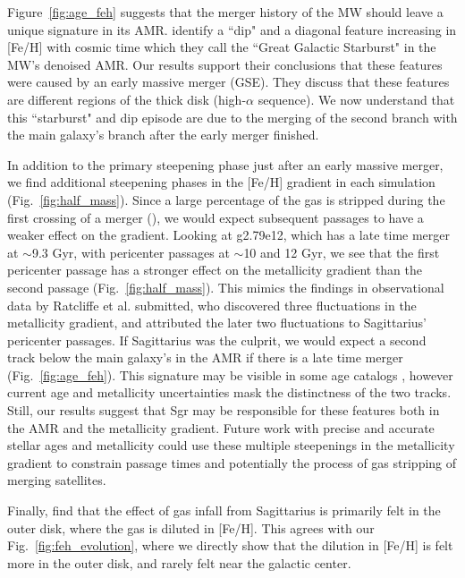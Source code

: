 \documentclass[useAMS,usenatbib]{mnras}
\begin{document}
Figure~\ref{fig:age_feh} suggests that the merger history of the MW should leave a unique signature in its AMR. \cite{Ciuca2022} identify a ``dip" and a diagonal feature increasing in [Fe/H] with cosmic time which they call the ``Great Galactic Starburst" in the MW's denoised AMR. Our results support their conclusions that these features were caused by an early massive merger (GSE). They discuss that these features are different regions of the thick disk (high-$\alpha$ sequence). We now understand that this ``starburst" and dip episode are due to the merging of the second branch with the main galaxy's branch after the early merger finished.

In addition to the primary steepening phase just after an early massive merger, we find additional steepening phases in the [Fe/H] gradient in each simulation (Fig.~\ref{fig:half_mass}).  Since a large percentage of the gas is stripped during the first crossing of a merger (\citealt{TepperGarcia2018}), we would expect subsequent passages to have a weaker effect on the gradient. Looking at g2.79e12, which has a late time merger at $\sim$9.3 Gyr, with pericenter passages at $\sim$10 and 12 Gyr, we see that the first pericenter passage has a stronger effect on the metallicity gradient than the second passage (Fig.~\ref{fig:half_mass}). This mimics the findings in observational data by Ratcliffe et al. submitted, who discovered three fluctuations in the metallicity gradient, and attributed the later two fluctuations to Sagittarius’ pericenter passages. If Sagittarius was the culprit, we would expect a second track below the main galaxy's in the AMR if there is a late time merger (Fig.~\ref{fig:age_feh}). This signature may be visible in some age catalogs \citep{Xiang2022,Anders2023}, however current age and metallicity uncertainties mask the distinctness of the two tracks. Still, our results suggest that Sgr may be responsible for these features both in the AMR and the metallicity gradient. Future work with precise and accurate stellar ages and metallicity could use these multiple steepenings in the metallicity gradient to constrain passage times and potentially the process of gas stripping of merging satellites.

Finally, \cite{Annem2022} find that the effect of gas infall from Sagittarius is primarily felt in the outer disk, where the gas is diluted in [Fe/H]. This agrees with our Fig.~\ref{fig:feh_evolution}, where we directly show that the dilution in [Fe/H] is felt more in the outer disk, and rarely felt near the galactic center.
\end{document}
